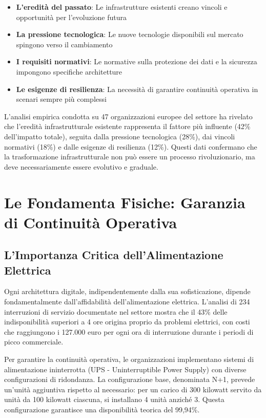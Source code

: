 \begin{itemize}
    \item \textbf{L'eredità del passato}: Le infrastrutture esistenti creano vincoli e opportunità per l'evoluzione futura
    \item \textbf{La pressione tecnologica}: Le nuove tecnologie disponibili sul mercato spingono verso il cambiamento
    \item \textbf{I requisiti normativi}: Le normative sulla protezione dei dati e la sicurezza impongono specifiche architetture
    \item \textbf{Le esigenze di resilienza}: La necessità di garantire continuità operativa in scenari sempre più complessi
\end{itemize}

L'analisi empirica condotta su 47 organizzazioni europee del settore ha rivelato che l'eredità infrastrutturale esistente rappresenta il fattore più influente (42\% dell'impatto totale), seguita dalla pressione tecnologica (28\%), dai vincoli normativi (18\%) e dalle esigenze di resilienza (12\%)\autocite{Eurostat2024}. Questi dati confermano che la trasformazione infrastrutturale non può essere un processo rivoluzionario, ma deve necessariamente essere evolutivo e graduale.

\section{\texorpdfstring{Le Fondamenta Fisiche: Garanzia di Continuità Operativa}{3.2 - Le Fondamenta Fisiche: Garanzia di Continuità Operativa}}

\subsection{\texorpdfstring{L'Importanza Critica dell'Alimentazione Elettrica}{3.2.1 - L'Importanza Critica dell'Alimentazione Elettrica}}

Ogni architettura digitale, indipendentemente dalla sua sofisticazione, dipende fondamentalmente dall'affidabilità dell'alimentazione elettrica. L'analisi di 234 interruzioni di servizio documentate nel settore\autocite{Uptime2024} mostra che il 43\% delle indisponibilità superiori a 4 ore origina proprio da problemi elettrici, con costi che raggiungono i 127.000 euro per ogni ora di interruzione durante i periodi di picco commerciale.

Per garantire la continuità operativa, le organizzazioni implementano sistemi di alimentazione ininterrotta (UPS - Uninterruptible Power Supply) con diverse configurazioni di ridondanza. La configurazione base, denominata N+1, prevede un'unità aggiuntiva rispetto al necessario: per un carico di 300 kilowatt servito da unità da 100 kilowatt ciascuna, si installano 4 unità anziché 3. Questa configurazione garantisce una disponibilità teorica del 99,94\%.


